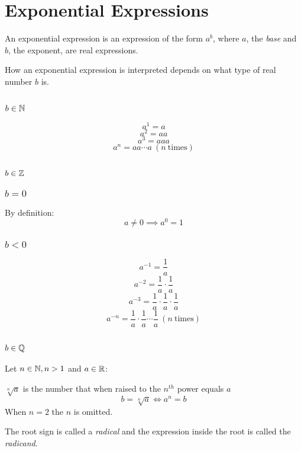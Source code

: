 \documentclass[letterpaper,12pt,fleqn]{article}
\begin{document}
\section*{Exponential Expressions}

\begin{definition}
  An exponential expression is an expression of the form $a^b$, where $a$, the
  \emph{base} and $b$, the exponent, are real expressions.
\end{definition}

How an exponential expression is interpreted depends on what type of real
number $b$ is.

\subsection*{$b\in\mathbb{N}$}

\[a^1=a\]
\[a^2=aa\]
\[a^3=aaa\]
\[a^n=aa\cdots a\ (n\ \mbox{times})\]

\subsection*{$b\in\mathbb{Z}$}

\subsubsection*{$b=0$}

By definition:
\[a\ne0\implies a^0=1\]

\subsubsection*{$b<0$}

\[a^{-1}=\frac{1}{a}\]
\[a^{-2}=\frac{1}{a}\cdot\frac{1}{a}\]
\[a^{-3}=\frac{1}{a}\cdot\frac{1}{a}\cdot\frac{1}{a}\]
\[a^{-n}=\frac{1}{a}\cdot\frac{1}{a}\cdots\frac{1}{a}\ (n\ \mbox{times})\]

\subsection*{$b\in\mathbb{Q}$}

\begin{definition}
  Let $n\in\mathbb{N},n>1$ and $a\in\mathbb{R}$:
  
  $\sqrt[n]{a}$ is the number that when raised to the $n^{th}$ power equals $a$
  \[b=\sqrt[n]{a}\iff a^n=b\]
  When $n=2$ the $n$ is omitted.

  The root sign is called a \emph{radical} and the expression inside the root
  is called the \emph{radicand}.
\end{definition}
\end{document}
